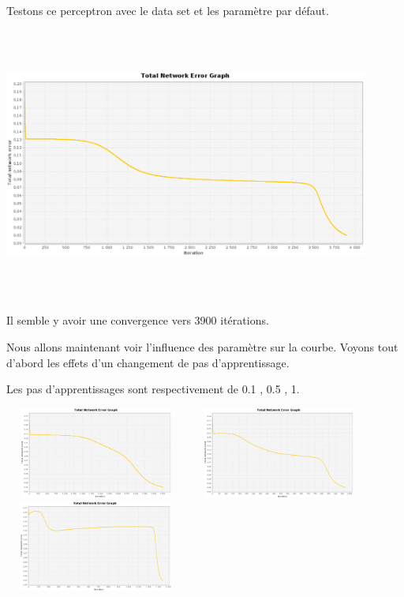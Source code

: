 \documentclass[twoside,openright,a4paper,11pt,french]{article}
\begin{document}
Testons ce perceptron avec le data set et les paramètre par défaut.

\includegraphics[width=12cm,height=9cm]{./pics/eq/multi_eq_def.eps}

Il semble y avoir une convergence vers 3900 itérations.

Nous allons maintenant voir l'influence des paramètre sur la courbe. Voyons tout d'abord
les effets d'un changement de pas d'apprentissage.

Les pas d'apprentissages sont respectivement de 0.1 , 0.5 , 1.

\includegraphics[width=6cm,height=3cm]{./pics/eq/multi_eq_0.1.eps}
\includegraphics[width=6cm,height=3cm]{./pics/eq/multi_eq_0.5.eps}
\includegraphics[width=6cm,height=3cm]{./pics/eq/multi_eq_1.eps}
\end{document}
